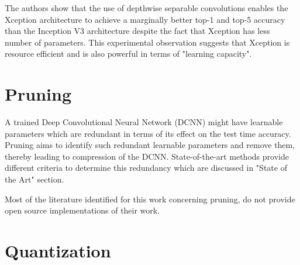 The authors show that the use of depthwise separable convolutions enables the Xception architecture to achieve a marginally better top-1 and top-5 accuracy than the Inception V3 architecture despite the fact that Xception has less number of parameters. This experimental observation suggests that Xception is resource efficient and is also powerful in terms of "learning capacity".

\section{Pruning}

A trained Deep Convolutional Neural Network (DCNN) might have learnable parameters which are redundant in terms of its effect on the test time accuracy. Pruning aims to identify such redundant learnable parameters and remove them, thereby leading to compression of the DCNN. State-of-the-art methods provide different criteria to determine this redundancy which are discussed in "State of the Art" section.

Most of the literature identified for this work concerning pruning, do not provide open source implementations of their work. 

\section{Quantization}
